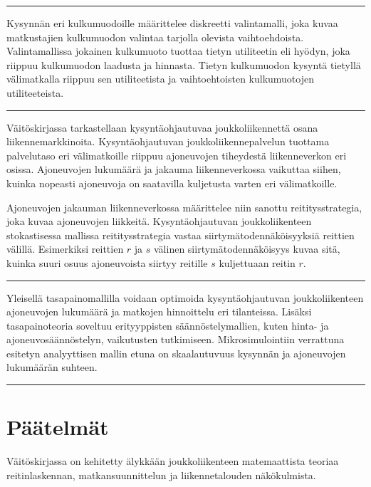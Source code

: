 \documentclass[a4paper,12pt]{article}
\newcommand*\sepline{%
  \begin{center}
    \rule[1ex]{.5\textwidth}{.5pt}
  \end{center}}
\begin{document}
\sepline

Kysynnän eri kulkumuodoille määrittelee diskreetti valintamalli, joka kuvaa matkustajien kulkumuodon valintaa tarjolla olevista vaihtoehdoista.
Valintamallissa jokainen kulkumuoto tuottaa tietyn utiliteetin eli hyödyn, joka riippuu kulkumuodon laadusta ja hinnasta. 
Tietyn kulkumuodon kysyntä tietyllä välimatkalla riippuu sen utiliteetista ja vaihtoehtoisten kulkumuotojen utiliteeteista.

\sepline

Väitöskirjassa tarkastellaan kysyntäohjautuvaa joukkoliikennettä osana liikennemarkkinoita. Kysyntäohjautuvan joukkoliikennepalvelun
tuottama palvelutaso eri välimatkoille riippuu ajoneuvojen tiheydestä liikenneverkon eri osissa.
Ajoneuvojen lukumäärä ja jakauma liikenneverkossa vaikuttaa siihen, kuinka nopeasti ajoneuvoja on 
saatavilla kuljetusta varten eri välimatkoille.

Ajoneuvojen jakauman liikenneverkossa määrittelee niin sanottu reititysstrategia, joka kuvaa ajoneuvojen liikkeitä.
Kysyntäohjautuvan joukkoliikenteen stokastisessa mallissa reititysstrategia vastaa siirtymätodennäköisyyksiä reittien välillä.
Esimerkiksi reittien $r$ ja $s$ välinen siirtymätodennäköisyys kuvaa sitä, kuinka suuri osuus 
ajoneuvoista siirtyy reitille $s$ kuljettuaan reitin $r$.

\sepline
Yleisellä tasapainomallilla voidaan optimoida kysyntäohjautuvan joukkoliikenteen ajoneuvojen lukumäärä ja 
matkojen hinnoittelu eri tilanteissa. Lisäksi tasapainoteoria soveltuu erityyppisten säännöstelymallien, 
kuten hinta- ja ajoneuvosäännöstelyn, vaikutusten tutkimiseen. Mikrosimulointiin verrattuna esitetyn analyyttisen mallin
etuna on skaalautuvuus kysynnän ja ajoneuvojen lukumäärän suhteen.

\sepline



\section*{Päätelmät}
Väitöskirjassa on kehitetty älykkään joukkoliikenteen matemaattista teoriaa reitinlaskennan, matkansuunnittelun ja
liikennetalouden näkökulmista.
\end{document}
